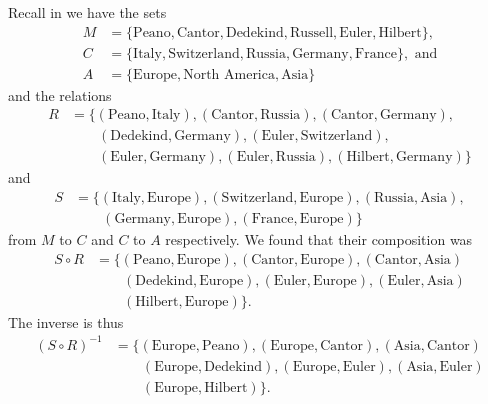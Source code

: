 \begin{example}
    Recall in  we have the sets
    \begin{align*}
        M &= \{\text{Peano}, \text{Cantor}, \text{Dedekind}, \text{Russell}, \text{Euler}, \text{Hilbert}\},\\
        C &=\{\text{Italy}, \text{Switzerland}, \text{Russia}, \text{Germany}, \text{France}\}, \text{ and}\\
        A &= \{\text{Europe}, \text{North America}, \text{Asia}\}
    \end{align*}
    and the relations
    \begin{align*}
        R &= \{(\text{Peano}, \text{Italy}), (\text{Cantor}, \text{Russia}), (\text{Cantor}, \text{Germany}),\\
        &\quad\quad(\text{Dedekind}, \text{Germany}), (\text{Euler}, \text{Switzerland}),\\
        &\quad\quad(\text{Euler}, \text{Germany}), (\text{Euler}, \text{Russia}), (\text{Hilbert}, \text{Germany})\}
    \end{align*}
    and
    \begin{align*}
        S &= \{(\text{Italy}, \text{Europe}), (\text{Switzerland}, \text{Europe}), (\text{Russia}, \text{Asia}),\\
        &\quad\quad(\text{Germany}, \text{Europe}), (\text{France}, \text{Europe})\}
    \end{align*}
    from $M$ to $C$ and $C$ to $A$ respectively. We found that their composition was
    \begin{align*}
        S \circ R &= \{(\text{Peano}, \text{Europe}), (\text{Cantor}, \text{Europe}), (\text{Cantor}, \text{Asia})\\
        &\quad\quad (\text{Dedekind}, \text{Europe}), (\text{Euler}, \text{Europe}), (\text{Euler}, \text{Asia})\\
        &\quad\quad (\text{Hilbert}, \text{Europe})\}.
    \end{align*}
    The inverse is thus
    \begin{align*}
        (S \circ R)^{-1} &= \{(\text{Europe}, \text{Peano}), (\text{Europe}, \text{Cantor}), (\text{Asia}, \text{Cantor})\\
        &\quad\quad (\text{Europe}, \text{Dedekind}), (\text{Europe}, \text{Euler}), (\text{Asia}, \text{Euler})\\
        &\quad\quad (\text{Europe}, \text{Hilbert})\}.
    \end{align*}


\end{example}
